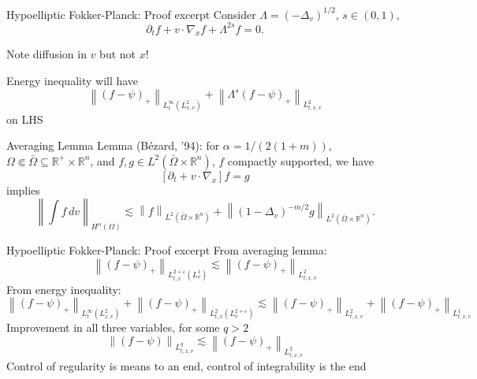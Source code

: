 \documentclass{beamer}
\newcommand{\R}{\mathbb{R}}
\newcommand{\eps}{\varepsilon}
\newcommand{\norm}[1]{\left\lVert#1\right\rVert}
\newcommand{\bracket}[1]{\left[ #1 \right]}
\newcommand{\abs}[1]{\left\lvert #1 \right\rvert}
\newcommand{\del}{\partial}
\newcommand{\grad}{\nabla}
\newcommand{\Laplace}{\Delta}
\begin{document}
\begin{frame}{Hypoelliptic Fokker-Planck: Proof excerpt}
\pause
Consider $\Lambda = (-\Laplace_v)^{1/2}$, $s \in (0,1)$,
\[ \del_t f + v\cdot\grad_x f + \Lambda^{2s} f = 0. \]

Note diffusion in $v$ but not $x$!

Energy inequality will have
\[ \norm{(f-\psi)_+}_{L^\infty_t(L^2_{x,v})} + \norm{\Lambda^s (f-\psi)_+}_{L^2_{t,x,v}} \]
on LHS
\end{frame}


\begin{frame}{Averaging Lemma}
Lemma (B\'{e}zard, '94): for $\alpha = 1/(2(1+m))$, $\Omega \Subset \bar{\Omega} \subseteq \R^+ \times \R^n$, and $f,g \in L^2(\bar{\Omega} \times \R^n)$, $f$ compactly supported, we have
\[ \bracket{\del_t + v\cdot\grad_x} f = g \]
implies
\[ \norm{\int f \,dv}_{H^\alpha(\Omega)} \lesssim \norm{f}_{L^2(\bar{\Omega} \times \R^n)} + \norm{(1-\Laplace_v)^{-m/2} g }_{L^2(\bar{\Omega} \times \R^n)}. \]
\end{frame}




\begin{frame}{Hypoelliptic Fokker-Planck: Proof excerpt}
From averaging lemma:
\[ \norm{(f-\psi)_+}_{L^{2+\eps}_{t,x}(L^1_v)} \lesssim \norm{(f-\psi)_+}_{L^2_{t,x,v}} \]
\pause
From energy inequality:
\[ \norm{(f-\psi)_+}_{L^\infty_t(L^2_{x,v})} + \norm{(f-\psi)_+}_{L^2_{t,x}(L^{2+\eps}_v)} \lesssim \norm{(f-\psi)_+}_{L^2_{t,x,v}} + \norm{(f-\psi)_+}_{L^1_{t,x,v}} \]
\pause
Improvement in all three variables, for some $q > 2$
\[ \norm{(f-\psi)}_{L^q_{t,x,v}} \lesssim \norm{(f-\psi)_+}_{L^2_{t,x,v}} \]
\pause
Control of regularity is means to an end, control of integrability is the end
\end{frame}
\end{document}
